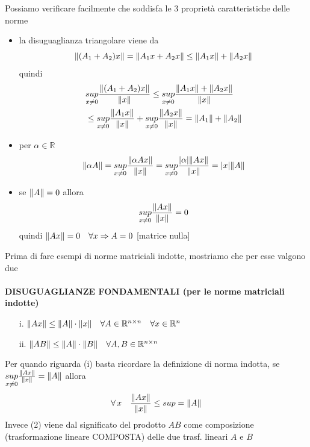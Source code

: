 \documentclass[12pt,a4paper]{article}
\DeclarePairedDelimiter{\abs}{\lvert}{\rvert}
\DeclarePairedDelimiter{\norma}{\lVert}{\rVert}
\begin{document}
Possiamo verificare facilmente che soddisfa le 3 proprietà
caratteristiche delle norme
\begin{itemize}
    \item la disuguaglianza triangolare viene da
    \[
    \norma{(A_1 + A_2)x} = \norma{A_1x + A_2x} \le \norma{A_1x} + \norma{A_2x}
    \]
    quindi
    \[
    \begin{split}
        & \underset{x \neq 0}{sup} \frac{\norma{(A_1 + A_2)x}}{\norma{x}} \le \underset{x \neq 0}{sup} \frac{\norma{A_1x} + \norma{A_2x}}{\norma{x}} \\
        & \le \underset{x \neq 0}{sup} \frac{\norma{A_1x}}{\norma{x}} + \underset{x \neq 0}{sup} \frac{\norma{A_2x}}{\norma{x}} = \norma{A_1} + \norma{A_2}
    \end{split}
    \]
    
    \item per $\alpha \in \mathbb{R}$
    \[
    \norma{\alpha A} = \underset{x \neq 0}{sup} \frac{\norma{\alpha Ax}}{\norma{x}}
    = \underset{x \neq 0}{sup} \frac{\abs{\alpha} \norma{Ax}}{\norma{x}} = \abs{x} \norma{A}
    \]
    
    \item se $\norma{A} = 0$ allora \[\underset{x \neq 0}{sup} \frac{\norma{Ax}}{\norma{x}} = 0\]
    quindi $\norma{Ax} = 0 \quad \forall x \Rightarrow A = 0$ [matrice nulla]
\end{itemize}
Prima di fare esempi di norme matriciali indotte, mostriamo che per esse valgono due\\\\
\textbf{DISUGUAGLIANZE FONDAMENTALI (per le norme matriciali indotte)}
\begin{enumerate}
    \item[i.] $\norma{Ax} \le \norma{A} \cdot \norma{x} \quad \forall A \in \mathbb{R}^{n \times n} \quad \forall x \in \mathbb{R}^n$
    
    \item[ii.] $\norma{AB} \le \norma{A} \cdot \norma{B} \quad \forall A, B \in \mathbb{R}^{n \times n}$
\end{enumerate}
Per quando riguarda (i) basta ricordare la definizione di norma
indotta, se $\underset{x \neq 0}{sup} \frac{\norma{Ax}}{\norma{x}} = \norma{A}$ allora 
\[\forall \, x \quad \frac{\norma{Ax}}{\norma{x}} \le sup = \norma{A}\]
Invece (2) viene dal significato del prodotto $AB$ come composizione (trasformazione lineare COMPOSTA) delle due trasf. lineari $A$ e $B$
\end{document}
